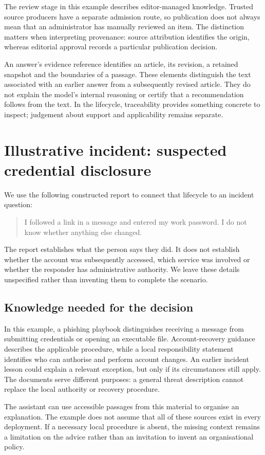 The review stage in this example describes editor-managed knowledge. Trusted source producers have a separate admission route, so publication does not always mean that an administrator has manually reviewed an item. The distinction matters when interpreting provenance: source attribution identifies the origin, whereas editorial approval records a particular publication decision.

An answer's evidence reference identifies an article, its revision, a retained snapshot and the boundaries of a passage. These elements distinguish the text associated with an earlier answer from a subsequently revised article. They do not explain the model's internal reasoning or certify that a recommendation follows from the text. In the lifecycle, traceability provides something concrete to inspect; judgement about support and applicability remains separate.

\section{Illustrative incident: suspected credential disclosure}
We use the following constructed report to connect that lifecycle to an incident question:
\begin{quote}
I followed a link in a message and entered my work password. I do not know whether anything else changed.
\end{quote}
The report establishes what the person says they did. It does not establish whether the account was subsequently accessed, which service was involved or whether the responder has administrative authority. We leave these details unspecified rather than inventing them to complete the scenario.

\subsection{Knowledge needed for the decision}
In this example, a phishing playbook distinguishes receiving a message from submitting credentials or opening an executable file. Account-recovery guidance describes the applicable procedure, while a local responsibility statement identifies who can authorise and perform account changes. An earlier incident lesson could explain a relevant exception, but only if its circumstances still apply. The documents serve different purposes: a general threat description cannot replace the local authority or recovery procedure.

The assistant can use accessible passages from this material to organise an explanation. The example does not assume that all of these sources exist in every deployment. If a necessary local procedure is absent, the missing context remains a limitation on the advice rather than an invitation to invent an organisational policy.

